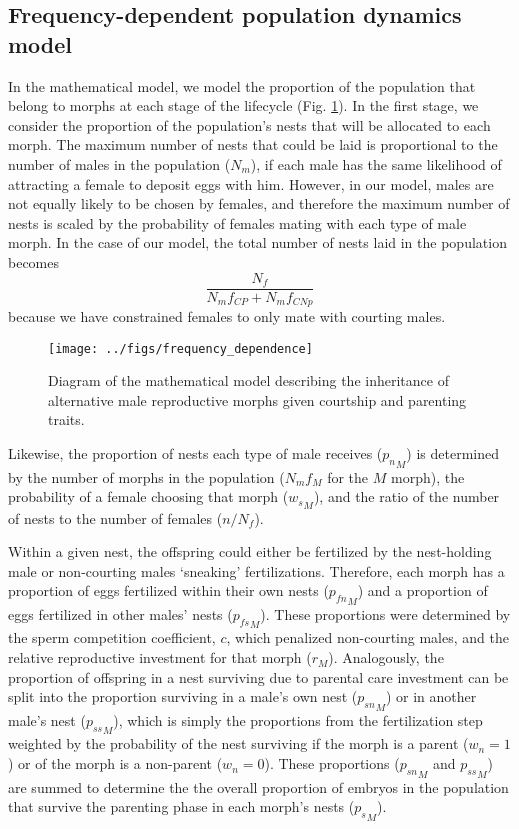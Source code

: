 \documentclass[11pt,]{article}
\begin{document}
\hypertarget{frequency-dependent-population-dynamics-model}{%
\subsection{Frequency-dependent population dynamics model}\label{frequency-dependent-population-dynamics-model}}

In the mathematical model, we model the proportion of the population
that belong to morphs at each stage of the lifecycle (Fig.
\ref{fig:mathModel}). In the first stage, we consider the proportion of
the population's nests that will be allocated to each morph. The maximum
number of nests that could be laid is proportional to the number of
males in the population (\(N_m\)), if each male has the same likelihood of
attracting a female to deposit eggs with him. However, in our model,
males are not equally likely to be chosen by females, and therefore the
maximum number of nests is scaled by the probability of females mating
with each type of male morph. In the case of our model, the total number
of nests laid in the population becomes \[
\frac{N_f}{N_mf_{CP}+N_m f_{CNp}}
\] because we have constrained females to only mate with courting males.

\begin{figure}[H]
\texttt{[image: ../figs/frequency\_dependence]} \caption{Diagram of the mathematical model describing the inheritance of alternative male reproductive morphs given courtship and parenting traits.}\label{fig:mathModel}
\end{figure}

Likewise, the proportion of nests each type of male receives (\({p_n}_M\))
is determined by the number of morphs in the population (\(N_mf_M\) for
the \(M\) morph), the probability of a female choosing that morph
(\({w_s}_M\)), and the ratio of the number of nests to the number of
females (\(n/N_f\)).

Within a given nest, the offspring could either be fertilized by the
nest-holding male or non-courting males `sneaking' fertilizations.
Therefore, each morph has a proportion of eggs fertilized within their
own nests (\({p_{fn}}_M\)) and a proportion of eggs fertilized in other
males' nests (\({p_{fs}}_M\)). These proportions were determined by the
sperm competition coefficient, \(c\), which penalized non-courting males,
and the relative reproductive investment for that morph (\(r_M\)).
Analogously, the proportion of offspring in a nest surviving due to
parental care investment can be split into the proportion surviving in a
male's own nest (\({p_{sn}}_M\)) or in another male's nest (\({p_{ss}}_M\)),
which is simply the proportions from the fertilization step weighted by
the probability of the nest surviving if the morph is a parent (\(w_n=1\))
or of the morph is a non-parent (\(w_n=0\)). These proportions
(\({p_{sn}}_M\) and \({p_{ss}}_M\)) are summed to determine the the overall
proportion of embryos in the population that survive the parenting phase
in each morph's nests (\({p_s}_M\)).
\end{document}
